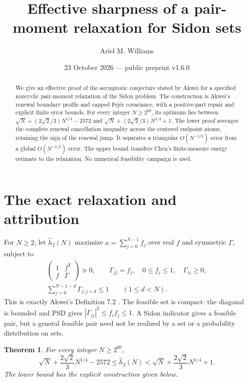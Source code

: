 \documentclass[11pt]{article}
\title{Effective sharpness of a pair-moment relaxation for Sidon sets}
\author{Ariel M. Williams}
\date{23 October 2026 --- public preprint v1.6.0}
\newtheorem{theorem}{Theorem}
\newcommand{\Htwo}{\widehat h_2}
\begin{document}
\maketitle
\begin{abstract}
We give an effective proof of the asymptotic conjecture stated by Akwei for
a specified noncyclic pair-moment relaxation of the Sidon problem.
The construction is Akwei's renewal boundary profile and capped Fej\'er
covariance, with a positive-part repair and explicit finite error bounds.
For every integer \(N\ge2^{60}\), its optimum lies between
\(\sqrt N+(2\sqrt2/3)N^{1/4}-2572\) and
\(\sqrt N+(2\sqrt2/3)N^{1/4}+1\).
The lower proof averages the complete renewal cancellation inequality across
the centered endpoint atoms, retaining the sign of the renewal jump.
It separates a triangular \(O(N^{-1/4})\) error from a global
\(O(N^{-1/2})\) error. The upper bound transfers Chen's finite-measure
energy estimate to the relaxation. No numerical feasibility campaign is used.
\end{abstract}

\section{The exact relaxation and attribution}
For \(N\ge2\), let \(\Htwo(N)\) maximize
\(\kappa=\sum_{j=0}^{N-1} f_j\) over real \(f\) and symmetric \(\Gamma\), subject to
\begin{gather}
 \begin{pmatrix}1&f^{\mathsf T}\\f&\Gamma\end{pmatrix}\succeq0,\qquad
 \Gamma_{jj}=f_j,\quad 0\le f_j\le1,\quad \Gamma_{ij}\ge0, \label{model}\\
 \sum_{j=0}^{N-1-d}\Gamma_{j,j+d}\le1\qquad(1\le d<N). \label{budgets}
\end{gather}
This is exactly Akwei's Definition 7.2 \cite{akwei}. The feasible set is
compact: the diagonal is bounded and PSD gives
\(|\Gamma_{ij}|^2\le f_i f_j\le1\).
A Sidon indicator gives a feasible pair, but a general feasible pair need not
be realized by a set or a probability distribution on sets.

\begin{theorem}\label{main}
For every integer \(N\ge2^{60}\),
\[
 \sqrt N+\frac{2\sqrt2}{3}N^{1/4}-2572
 \le\Htwo(N)<
 \sqrt N+\frac{2\sqrt2}{3}N^{1/4}+1.
\]
The lower bound has the explicit construction given below.
\end{theorem}
\end{document}
